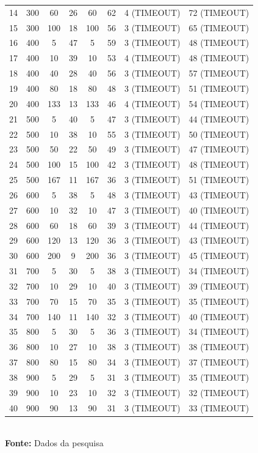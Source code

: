 \begin{table}[h]
\begin{tabular}{c|c|c|c|c|c|c|c}
		14 & 300 & 60 & 26 & 60 & 62 & 4 (TIMEOUT) & 72 (TIMEOUT)\\
		15 & 300 & 100 & 18 & 100 & 56 & 3 (TIMEOUT) & 65 (TIMEOUT)\\
		16 & 400 & 5 & 47 & 5 & 59 & 3 (TIMEOUT) & 48 (TIMEOUT)\\
		17 & 400 & 10 & 39 & 10 & 53 & 4 (TIMEOUT) & 48 (TIMEOUT)\\
		18 & 400 & 40 & 28 & 40 & 56 & 3 (TIMEOUT) & 57 (TIMEOUT)\\
		19 & 400 & 80 & 18 & 80 & 48 & 3 (TIMEOUT) & 51 (TIMEOUT)\\
		20 & 400 & 133 & 13 & 133 & 46 & 4 (TIMEOUT) & 54 (TIMEOUT)\\
		21 & 500 & 5 & 40 & 5 & 47 & 3 (TIMEOUT) & 44 (TIMEOUT) \\
		22 & 500 & 10 & 38 & 10 & 55  & 3 (TIMEOUT) & 50 (TIMEOUT)\\
		23 & 500 & 50 & 22 & 50 & 49  & 3 (TIMEOUT) & 47 (TIMEOUT)\\
		24 & 500 & 100 & 15 & 100 & 42 & 3 (TIMEOUT) & 48 (TIMEOUT) \\
		25 & 500 & 167 & 11 & 167 & 36 & 3 (TIMEOUT) & 51 (TIMEOUT) \\
		26 & 600 & 5 & 38 & 5 & 48 & 3 (TIMEOUT) & 43 (TIMEOUT) \\
		27 & 600 & 10 & 32 & 10 & 47  & 3 (TIMEOUT) & 40 (TIMEOUT)\\
		28 & 600 & 60 & 18 & 60 & 39 & 3 (TIMEOUT) & 44 (TIMEOUT) \\
		29 & 600 & 120 & 13 & 120 & 36  & 3 (TIMEOUT) & 43 (TIMEOUT)\\
		30 & 600 & 200 & 9 & 200 & 36 & 3 (TIMEOUT) & 45 (TIMEOUT) \\
		31 & 700 & 5 & 30 & 5 & 38  & 3 (TIMEOUT) & 34 (TIMEOUT)\\
		32 & 700 & 10 & 29 & 10 & 40  & 3 (TIMEOUT) & 39 (TIMEOUT)\\
		33 & 700 & 70 & 15 & 70 & 35 & 3 (TIMEOUT) & 35 (TIMEOUT)\\
		34 & 700 & 140 & 11 & 140 & 32 & 3 (TIMEOUT) & 40 (TIMEOUT)\\
		35 & 800 & 5 & 30 & 5 & 36 & 3 (TIMEOUT) & 34 (TIMEOUT)\\
		36 & 800 & 10 & 27 & 10 & 38 & 3 (TIMEOUT) & 38 (TIMEOUT) \\
		37 & 800 & 80 & 15 & 80 & 34 & 3 (TIMEOUT) & 37 (TIMEOUT) \\
		38 & 900 & 5 & 29 & 5 & 31 & 3 (TIMEOUT) & 35 (TIMEOUT)\\
		39 & 900 & 10 & 23 & 10 & 32 & 3 (TIMEOUT) & 32 (TIMEOUT)\\
		40 & 900 & 90 & 13 & 90 & 31 & 3 (TIMEOUT) & 33 (TIMEOUT)\\
		\hline
	\end{tabular}
	\vspace{.1cm} %
	\small
	{\footnotesize\\ \textbf{Fonte:} Dados da pesquisa}
\end{table}


